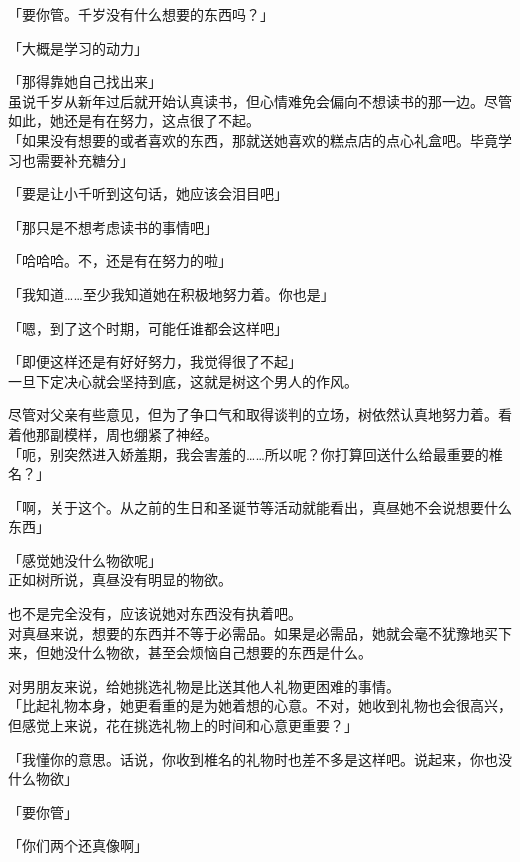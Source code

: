 「要你管。千岁没有什么想要的东西吗？」

「大概是学习的动力」

「那得靠她自己找出来」\\

虽说千岁从新年过后就开始认真读书，但心情难免会偏向不想读书的那一边。尽管如此，她还是有在努力，这点很了不起。\\

「如果没有想要的或者喜欢的东西，那就送她喜欢的糕点店的点心礼盒吧。毕竟学习也需要补充糖分」

「要是让小千听到这句话，她应该会泪目吧」

「那只是不想考虑读书的事情吧」

「哈哈哈。不，还是有在努力的啦」

「我知道……至少我知道她在积极地努力着。你也是」

「嗯，到了这个时期，可能任谁都会这样吧」

「即便这样还是有好好努力，我觉得很了不起」\\

一旦下定决心就会坚持到底，这就是树这个男人的作风。

尽管对父亲有些意见，但为了争口气和取得谈判的立场，树依然认真地努力着。看着他那副模样，周也绷紧了神经。\\

「呃，别突然进入娇羞期，我会害羞的……所以呢？你打算回送什么给最重要的椎名？」

「啊，关于这个。从之前的生日和圣诞节等活动就能看出，真昼她不会说想要什么东西」

「感觉她没什么物欲呢」\\

正如树所说，真昼没有明显的物欲。

也不是完全没有，应该说她对东西没有执着吧。\\

对真昼来说，想要的东西并不等于必需品。如果是必需品，她就会毫不犹豫地买下来，但她没什么物欲，甚至会烦恼自己想要的东西是什么。

对男朋友来说，给她挑选礼物是比送其他人礼物更困难的事情。\\

「比起礼物本身，她更看重的是为她着想的心意。不对，她收到礼物也会很高兴，但感觉上来说，花在挑选礼物上的时间和心意更重要？」

「我懂你的意思。话说，你收到椎名的礼物时也差不多是这样吧。说起来，你也没什么物欲」

「要你管」

「你们两个还真像啊」\\

